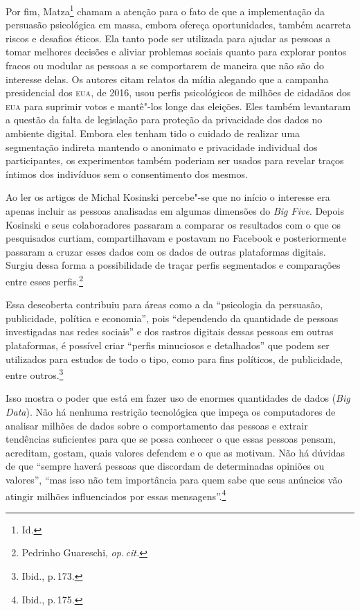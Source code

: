 Por fim, Matza\footnote{Id.} chamam a atenção para o fato de que a
implementação da persuasão psicológica em massa, embora ofereça
oportunidades, também acarreta riscos e desafios éticos. Ela tanto pode
ser utilizada para ajudar as pessoas a tomar melhores decisões e aliviar
problemas sociais quanto para explorar pontos fracos ou modular as
pessoas a se comportarem de maneira que não são do interesse delas. Os
autores citam relatos da mídia alegando que a campanha presidencial dos
\textsc{eua}, de 2016, usou perfis psicológicos de milhões de cidadãos dos \textsc{eua}
para suprimir votos e mantê"-los longe das eleições. Eles também
levantaram a questão da falta de legislação para proteção da privacidade
dos dados no ambiente digital. Embora eles tenham tido o cuidado de
realizar uma segmentação indireta mantendo o anonimato e privacidade
individual dos participantes, os experimentos também poderiam ser usados
para revelar traços íntimos dos indivíduos sem o consentimento dos
mesmos.

Ao ler os artigos de Michal Kosinski percebe"-se que no início o
interesse era apenas incluir as pessoas analisadas em algumas dimensões
do \emph{Big Five}. Depois Kosinski e seus colaboradores passaram a
comparar os resultados com o que os pesquisados curtiam, compartilhavam
e postavam no Facebook e posteriormente passaram a cruzar esses dados
com os dados de outras plataformas digitais. Surgiu dessa forma a
possibilidade de traçar perfis segmentados e comparações entre esses
perfis.\footnote{Pedrinho Guareschi, \textit{op.\,cit.}}

Essa descoberta contribuiu para áreas como a da ``psicologia da
persuasão, publicidade, política e economia'', pois ``dependendo da
quantidade de pessoas investigadas nas redes sociais'' e dos rastros
digitais dessas pessoas em outras plataformas, é possível criar ``perfis
minuciosos e detalhados'' que podem ser utilizados para estudos de todo
o tipo, como para fins políticos, de publicidade, entre outros.\footnote{Ibid., p.\,173.}

Isso mostra o poder que está em fazer uso de enormes quantidades de
dados (\emph{Big Data}). Não há nenhuma restrição tecnológica que impeça
os computadores de analisar milhões de dados sobre o comportamento das
pessoas e extrair tendências suficientes para que se possa conhecer o
que essas pessoas pensam, acreditam, gostam, quais valores defendem e o que as motivam. Não há dúvidas de que ``sempre haverá pessoas que discordam de determinadas opiniões ou valores'', ``mas isso não tem
importância para quem sabe que seus anúncios vão atingir milhões
influenciados por essas mensagens''.\footnote{Ibid., p.\,175.}

